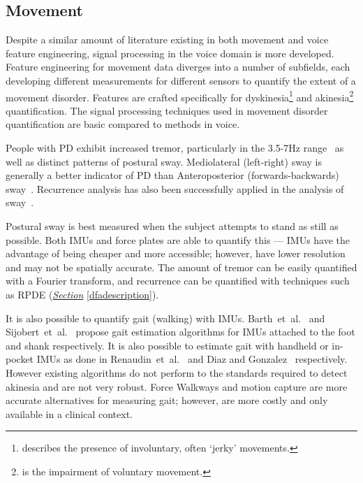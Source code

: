 \documentclass[12pt, twoside]{book}
\renewcommand\emph[1]{\textit{\color{USred}{#1}}}
\begin{document}
\subsection{Movement}\label{movementfeatures}
Despite a similar amount of literature existing in both movement and voice feature engineering, signal processing in the voice domain is more developed. Feature engineering for movement data diverges into a number of subfields, each developing different measurements for different sensors to quantify the extent of a movement disorder. Features are crafted specifically for dyskinesia\footnote{\emph{Dyskinesia} describes the presence of involuntary, often `jerky' movements.} and akinesia\footnote{\emph{Akinesia} is the impairment of voluntary movement.} quantification. The signal processing techniques used in movement disorder quantification are basic compared to methods in voice.

People with PD exhibit increased tremor, particularly in the 3.5-7Hz range~\cite{duval2004detection} as well as distinct patterns of postural sway. Mediolateral (left-right) sway is generally a better indicator of PD than Anteroposterior (forwards-backwards) sway~\cite{posturalswaylongitudinal}. Recurrence analysis has also been successfully applied in the analysis of sway~\cite{palmerini2011tremor, posturalswaylongitudinal}. 

Postural sway is best measured when the subject attempts to stand as still as possible. Both IMUs and force plates are able to quantify this --- IMUs have the advantage of being cheaper and more accessible; however, have lower resolution and may not be spatially accurate. The amount of tremor can be easily quantified with a Fourier transform, and recurrence can be quantified with techniques such as RPDE (\textit{\hyperref[dfadescription]{Section}} \ref{dfadescription}).

It is also possible to quantify gait (walking) with IMUs. Barth~et~al.~\cite{barth2011biometric} and Sijobert~et~al.~\cite{sijobert2015implementation} propose gait estimation algorithms for IMUs attached to the foot and shank respectively. It is also possible to estimate gait with handheld or in-pocket IMUs as done in Renaudin~et~al.~\cite{renaudin2012step} and Diaz and Gonzalez~\cite{diaz2014step} respectively. However existing algorithms do not perform to the standards required to detect akinesia and are not very robust. Force Walkways and motion capture are more accurate alternatives for measuring gait; however, are more costly and only available in a clinical context. 
\end{document}
